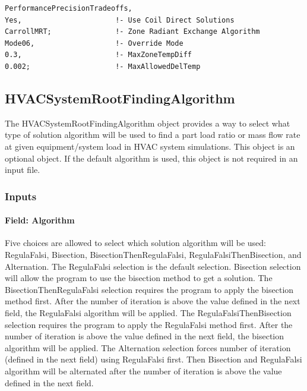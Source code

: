 \begin{lstlisting}
PerformancePrecisionTradeoffs,
Yes,                      !- Use Coil Direct Solutions
CarrollMRT;               !- Zone Radiant Exchange Algorithm
Mode06,                   !- Override Mode
0.3,                      !- MaxZoneTempDiff
0.002;                    !- MaxAllowedDelTemp
\end{lstlisting}


\subsection{HVACSystemRootFindingAlgorithm}\label{hvacystemrootfindingalgorithm}

The HVACSystemRootFindingAlgorithm object provides a way to select what type of solution
algorithm will be used to find a part load ratio or mass flow rate at given equipment/system load in HVAC system simulations. This object is an optional object. If the default algorithm is used, this object is not required in an input file.


\subsubsection{Inputs}\label{inputs-hvacystemrootfindingalgorithm}

\paragraph{Field: Algorithm}\label{field-algorithm-201710020807}

Five choices are allowed to select which solution algorithm will be used: RegulaFalsi, Bisection,  BisectionThenRegulaFalsi, RegulaFalsiThenBisection, and Alternation. The RegulaFalsi
selection is the default selection. Bisection selection will allow the program to use the bisection method to get a solution. The BisectionThenRegulaFalsi selection requires the program to apply the bisection method first. After the number of iteration is above the value defined in the next field, the RegulaFalsi algorithm will be applied. The RegulaFalsiThenBisection selection requires the program to apply the RegulaFalsi method first. After the number of iteration is above the value defined in the next field, the bisection algorithm will be applied. The Alternation selection forces number of iteration (defined in the next field) using RegulaFalsi first. Then Bisection and RegulaFalsi algorithm will be alternated after the number of iteration is above the value defined in the next field.


